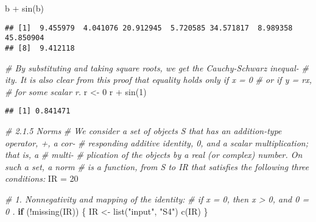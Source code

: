 \documentclass[
]{article}
\newenvironment{Shaded}{\begin{snugshade}}{\end{snugshade}}
\newcommand{\CommentTok}[1]{\textcolor[rgb]{0.56,0.35,0.01}{\textit{#1}}}
\newcommand{\ControlFlowTok}[1]{\textcolor[rgb]{0.13,0.29,0.53}{\textbf{#1}}}
\newcommand{\DecValTok}[1]{\textcolor[rgb]{0.00,0.00,0.81}{#1}}
\newcommand{\FunctionTok}[1]{\textcolor[rgb]{0.00,0.00,0.00}{#1}}
\newcommand{\NormalTok}[1]{#1}
\newcommand{\OtherTok}[1]{\textcolor[rgb]{0.56,0.35,0.01}{#1}}
\newcommand{\SpecialCharTok}[1]{\textcolor[rgb]{0.00,0.00,0.00}{#1}}
\newcommand{\StringTok}[1]{\textcolor[rgb]{0.31,0.60,0.02}{#1}}
\begin{document}
\begin{Shaded}
\begin{Highlighting}[]
\NormalTok{b }\SpecialCharTok{+} \FunctionTok{sin}\NormalTok{(b)}
\end{Highlighting}
\end{Shaded}

\begin{verbatim}
## [1]  9.455979  4.041076 20.912945  5.720585 34.571817  8.989358 45.850904
## [8]  9.412118
\end{verbatim}

\begin{Shaded}
\begin{Highlighting}[]
\CommentTok{\# By substituting and taking square roots, we get the Cauchy{-}Schwarz inequal{-}}
\CommentTok{\# ity. It is also clear from this proof that equality holds only if x = 0 }
\CommentTok{\# or if y = rx,}
\CommentTok{\# for some scalar r.}
\NormalTok{r }\OtherTok{\textless{}{-}} \DecValTok{0}
\NormalTok{r }\SpecialCharTok{+} \FunctionTok{sin}\NormalTok{(}\DecValTok{1}\NormalTok{)}
\end{Highlighting}
\end{Shaded}

\begin{verbatim}
## [1] 0.841471
\end{verbatim}

\begin{Shaded}
\begin{Highlighting}[]
\CommentTok{\# 2.1.5 Norms}
\CommentTok{\# We consider a set of objects S that has an addition{-}type operator, +, a cor{-}}
\CommentTok{\# responding additive identity, 0, and a scalar multiplication; that is, a }
\CommentTok{\# multi{-}}
\CommentTok{\# plication of the objects by a real (or complex) number. On such a set, a norm}
\CommentTok{\# is a function, from S to IR that satisﬁes the following three conditions:}
\NormalTok{IR }\OtherTok{=} \DecValTok{20}

\CommentTok{\# 1. Nonnegativity and mapping of the identity:}
\CommentTok{\# if x = 0, then x \textgreater{} 0, and 0 = 0 .}
\ControlFlowTok{if}\NormalTok{ (}\SpecialCharTok{!}\FunctionTok{missing}\NormalTok{(IR)) \{}
\NormalTok{  IR }\OtherTok{\textless{}{-}} \FunctionTok{list}\NormalTok{(}\StringTok{"input"}\NormalTok{, }\StringTok{"S4"}\NormalTok{)}
  \FunctionTok{c}\NormalTok{(IR)}
\NormalTok{\}}
\end{Highlighting}
\end{Shaded}
\end{document}
